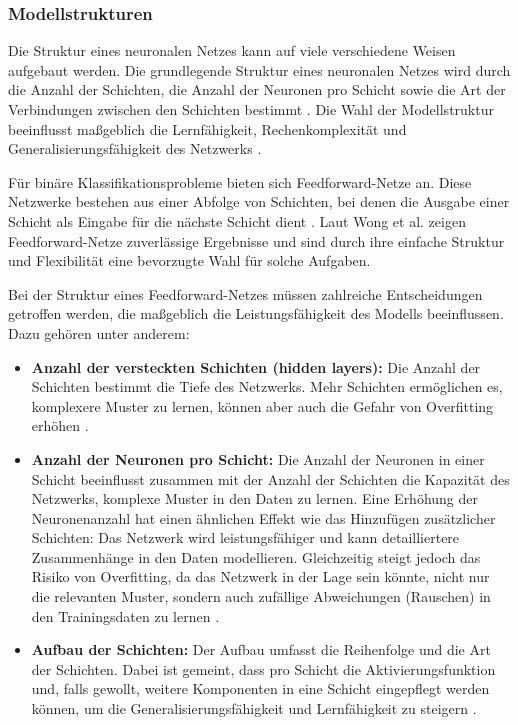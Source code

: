 \subsubsection{Modellstrukturen}
Die Struktur eines neuronalen Netzes kann auf viele verschiedene Weisen aufgebaut werden. 
Die grundlegende Struktur eines neuronalen Netzes wird durch die Anzahl der Schichten, die Anzahl der Neuronen pro Schicht sowie die Art der Verbindungen zwischen den Schichten bestimmt \cite{Goodfellow2016}. 
Die Wahl der Modellstruktur beeinflusst maßgeblich die Lernfähigkeit, Rechenkomplexität und Generalisierungsfähigkeit des Netzwerks \cite{LeCun2015}.  

Für binäre Klassifikationsprobleme bieten sich Feedforward-Netze an. Diese Netzwerke bestehen aus einer Abfolge von Schichten, bei denen die Ausgabe einer Schicht als Eingabe für die nächste Schicht dient \cite{nielsen2015neural}. Laut Wong et al. \cite{wong2011comparing} zeigen Feedforward-Netze zuverlässige Ergebnisse und sind durch ihre einfache Struktur und Flexibilität eine bevorzugte Wahl für solche Aufgaben.

Bei der Struktur eines Feedforward-Netzes müssen zahlreiche Entscheidungen getroffen werden, die maßgeblich die Leistungsfähigkeit des Modells beeinflussen. Dazu gehören unter anderem:
\begin{itemize}[noitemsep]
    \item \textbf{Anzahl der versteckten Schichten (hidden layers):}  
    Die Anzahl der Schichten bestimmt die Tiefe des Netzwerks. Mehr Schichten ermöglichen es, komplexere Muster zu lernen, können aber auch die Gefahr von Overfitting erhöhen \cite{Goodfellow2016}.
    \item \textbf{Anzahl der Neuronen pro Schicht:}  
    Die Anzahl der Neuronen in einer Schicht beeinflusst zusammen mit der Anzahl der Schichten die Kapazität des Netzwerks, komplexe Muster in den Daten zu lernen. Eine Erhöhung der Neuronenanzahl hat einen ähnlichen Effekt wie das Hinzufügen zusätzlicher Schichten: Das Netzwerk wird leistungsfähiger und kann detailliertere Zusammenhänge in den Daten modellieren. Gleichzeitig steigt jedoch das Risiko von Overfitting, da das Netzwerk in der Lage sein könnte, nicht nur die relevanten Muster, sondern auch zufällige Abweichungen (Rauschen) in den Trainingsdaten zu lernen \cite{Goodfellow2016}.
    \item \textbf{Aufbau der Schichten:}  
    Der Aufbau umfasst die Reihenfolge und die Art der Schichten. Dabei ist gemeint, dass pro Schicht die Aktivierungsfunktion und, falls gewollt, weitere Komponenten in eine Schicht eingepflegt werden können, um die Generalisierungsfähigkeit und Lernfähigkeit zu steigern \cite{Goodfellow2016}.
\end{itemize}


